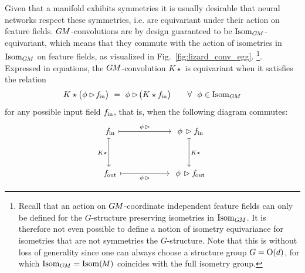 Given that a manifold exhibits symmetries it is usually desirable that neural networks respect these symmetries, i.e. are equivariant under their action on feature fields.
$G\mkern-1.4muM$-convolutions are by design guaranteed to be $\operatorname{Isom}_{G\mkern-1.4muM}$-equivariant, which means that they commute with the action of isometries in $\operatorname{Isom}_{G\mkern-1.4muM}$ on feature fields, as visualized in Fig.~\ref{fig:lizard_conv_egg}.%
\footnote{
    Recall that an action on $G\mkern-1.4muM$-coordinate independent feature fields can only be defined for the $G$-structure preserving isometries in $\operatorname{Isom}_{G\mkern-1.4muM}$.
    It is therefore not even possible to define a notion of isometry equivariance for isometries that are not symmetries the $G$-structure.
    Note that this is without loss of generality since one can always choose a structure group $G=\operatorname{O}(d)$, for which $\operatorname{Isom}_{G\mkern-1.4muM}=\operatorname{Isom}(\mkern-1.5mu M \mkern-.5mu)$ coincides with the full isometry group.
}.
Expressed in equations, the $G\mkern-1.4muM$-convolution $K\star$ is equivariant when it satisfies the relation
\begin{align}\label{eq:isometry_equivariance_conv_def_33}
    K \star \big( \phi\rhd\! \fin \big) \ =\ \phi\rhd\! \big( K \star \fin \big)
    \qquad \forall\ \ \phi\in \IsomGM
\end{align}
for any possible input field $f_\textup{\;\!\!in}$, that is, when the following diagram commutes:
\begin{equation}\label{cd:isometry_equivariance_conv_mapsto}
\begin{tikzcd}[column sep=60pt, row sep=35, font=\normalsize]
    \fin
        \arrow[r, "\phi\,\rhd", mapsto]
        \arrow[d, "K\star"', mapsto]
    &
    \phi\,\rhd \fin
        \arrow[d, "K\star", mapsto]
    \\
    \fout
        \arrow[r, "\phi\,\rhd"', mapsto]
    &
    \phi\,\rhd \fout
\end{tikzcd}
\end{equation}


